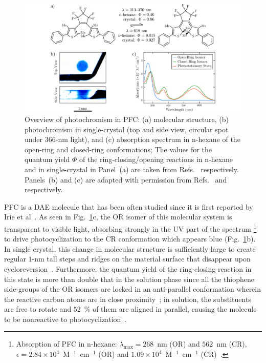 \begin{figure}[t!]
  \centering
  \includegraphics[width = \textwidth]{Figures/fig_DAE_PFC.pdf}
  \caption[Overview of 1,2-bis(2,4-dimethyl-5-phenyl-3-thienyl)perfluorocyclopentene.]{
    Overview of photochromism in PFC:
    (a) molecular structure,
    (b) photochromism in single-crystal (top and side view, circular spot under 366-nm light), and
    (c) absorption spectrum in n-hexane of the open-ring and closed-ring conformations;
    The values for the quantum yield $\Phi$ of the ring-closing/opening reactions
    in n-hexane and in single-crystal in Panel~(a) are taken from
    Refs.~\cite{Irie1995, Shibata2002} respectively.
    Panels~(b) and (c) are adapted with permission
    from Refs.~\cite{Irie2001} and~\cite{Irie1995} respectively.
  }
  \label{fig: DAE-PFC}
\end{figure}

PFC is a DAE molecule that has been often studied
since it is first reported by Irie et al~\cite{Irie1995}.
%
As seen in Fig.~\ref{fig: DAE-PFC}c,
the OR isomer of this molecular system is transparent to visible light,
absorbing strongly in the UV part of the spectrum%
\footnote{Absorption of PFC in n-hexane: $\lambda_\mathrm{max} = 268$~nm (OR) and $562$~nm (CR),
$\epsilon = 2.84 \times 10^4$~M$^{-1}$~cm$^{-1}$ (OR)
and $1.09 \times 10^4$~M$^{-1}$~cm$^{-1}$ (CR)~\cite{Irie1995}.}
to drive photocyclization to the CR conformation which appears blue (Fig.~\ref{fig: DAE-PFC}b).
%
In single crystal, this change in molecular structure is sufficiently large
to create regular $1$-nm tall steps and ridges on the material surface
that disappear upon cycloreversion~\cite{Irie2001}.
%
Furthermore, the quantum yield of the ring-closing reaction in this state
is more than double that in the solution phase
since all the thiophene side-groups of the OR isomers are locked in an anti-parallel conformation
wherein the reactive carbon atoms are in close proximity~\cite{Shibata2002};
in solution, the substituents are free to rotate and $52$~\% of them are aligned in parallel,
causing the molecule to be nonreactive to photocyclization~\cite{Irie1995, Pontecorvo2014}.

